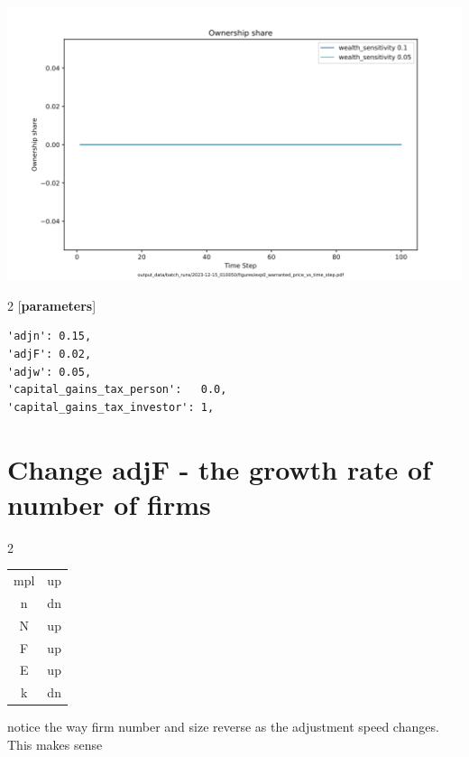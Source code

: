 \documentclass{article}
\begin{document}
\includegraphics[scale=.45]{fig/Analysis/exp0_warranted_price_vs_time_step.png}


\begin{multicols}{2}
[\textbf{parameters}]
\begin{verbatim}
'adjn': 0.15,
'adjF': 0.02,
'adjw': 0.05, 
'capital_gains_tax_person':   0.0,
'capital_gains_tax_investor': 1,
\end{verbatim}

\end{multicols}
\newpage
\section{Change adjF - the growth rate of number of firms }

\begin{multicols}{2}
\begin{tabular}{c|c}
  mpl   &  up\\
  n   &  dn\\
  N   &  up\\
  F   & up \\
  E   &  up\\
  k   & dn
\end{tabular}

  notice the way firm number and size reverse as the adjustment speed changes. This makes sense
  
\end{multicols}
\end{document}
